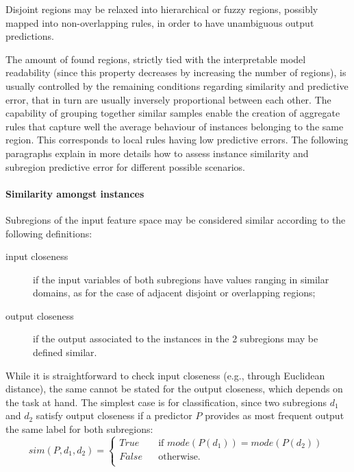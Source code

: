 \documentclass[
]{ceurart}
\begin{document}
Disjoint regions may be relaxed into hierarchical or fuzzy regions, possibly mapped into non-overlapping rules, in order to have unambiguous output predictions.

The amount of found regions, strictly tied with the interpretable model readability (since this property decreases by increasing the number of regions), is usually controlled by the remaining conditions regarding similarity and predictive error, that in turn are usually inversely proportional between each other.
%
The capability of grouping together similar samples enable the creation of aggregate rules that capture well the average behaviour of instances belonging to the same region.
%
This corresponds to local rules having low predictive errors.
%
The following paragraphs explain in more details how to assess instance similarity and subregion predictive error for different possible scenarios.

\paragraph{Similarity amongst instances}

Subregions of the input feature space may be considered similar according to the following definitions:
%
\begin{description}
	\item[input closeness] if the input variables of both subregions have values ranging in similar domains, as for the case of adjacent disjoint or overlapping regions;
	\item [output closeness] if the output associated to the instances in the 2 subregions may be defined similar.
\end{description}
%
While it is straightforward to check input closeness (e.g., through Euclidean distance), the same cannot be stated for the output closeness, which depends on the task at hand.
%
The simplest case is for classification, since two subregions $d_1$ and $d_2$ satisfy output closeness if a predictor $P$ provides as most frequent output the same label for both subregions:
%
\begin{equation}
	sim(P, d_1, d_2) = 
	\begin{cases}
		True \text{~~~~~~if~} mode(P(d_1)) = mode(P(d_2))\\
		False \text{~~~~~otherwise}.\\
	\end{cases}\,\label{eq:simClass}
\end{equation}
\end{document}
